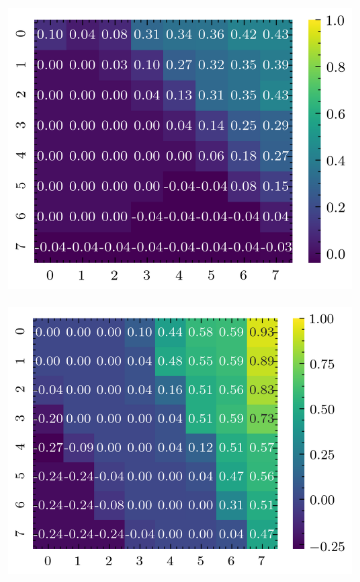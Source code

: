 \begin{figure}[H]
    \begin{subfigure}[b]{0.19\textwidth}
        \includegraphics[width=\linewidth]{../img/5/quarry/worst/heatmap-2d-0.png}
    \end{subfigure}
    \begin{subfigure}[b]{0.19\textwidth}
        \includegraphics[width=\linewidth]{../img/5/quarry/worst/heatmap-2d-1.png}
    \end{subfigure}  
    \begin{subfigure}[b]{0.19\textwidth}

\end{subfigure}
\end{figure}
